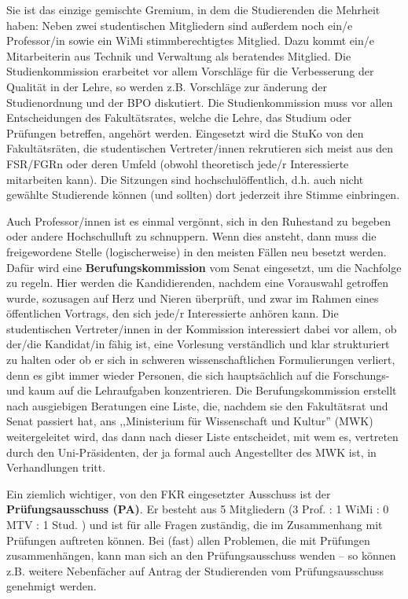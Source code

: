 Sie ist das einzige gemischte Gremium, in dem die Studierenden die Mehrheit 
haben: Neben zwei studentischen Mitgliedern sind außerdem noch ein/e Professor/in sowie ein WiMi stimmberechtigtes Mitglied. 
Dazu kommt ein/e Mitarbeiterin aus Technik und Verwaltung als beratendes Mitglied.
Die Studienkommission erarbeitet vor allem Vorschläge für die Verbesserung der 
Qualität in der Lehre, so werden z.B. Vorschläge zur änderung der 
Studienordnung und der BPO diskutiert. Die Studienkommission muss vor allen 
Entscheidungen des Fakultätsrates, welche die Lehre, das Studium oder 
Prüfungen betreffen, angehört werden. Eingesetzt wird die StuKo von den 
Fakultätsräten, die studentischen Vertreter/innen rekrutieren sich meist aus den 
FSR/FGRn oder deren Umfeld (obwohl theoretisch jede/r Interessierte mitarbeiten 
kann). Die Sitzungen sind hochschulöffentlich, d.h. auch nicht gewählte 
Studierende können (und sollten) dort jederzeit ihre Stimme einbringen.

Auch Professor/innen ist es einmal vergönnt, sich in den Ruhestand zu begeben oder 
andere Hochschulluft zu schnuppern. Wenn dies ansteht, dann muss die 
freigewordene Stelle (logischerweise) in den meisten Fällen neu besetzt 
werden. Dafür wird eine \textbf{Berufungskommission} vom Senat eingesetzt, um 
die Nachfolge zu regeln. Hier werden die Kandidierenden, nachdem eine Vorauswahl 
getroffen wurde, sozusagen auf Herz und Nieren überprüft, und zwar im Rahmen 
eines öffentlichen Vortrags, den sich jede/r Interessierte anhören kann. Die 
 studentischen Vertreter/innen in der Kommission interessiert dabei vor allem, ob 
der/die Kandidat/in fähig ist, eine Vorlesung verständlich und klar 
strukturiert zu halten oder ob er sich in schweren wissenschaftlichen 
Formulierungen verliert, denn es gibt immer wieder Personen, die sich
hauptsächlich auf die Forschungs- und kaum auf die Lehraufgaben konzentrieren.
Die Berufungskommission 
erstellt nach ausgiebigen Beratungen eine Liste, die, nachdem sie den Fakultätsrat und Senat 
passiert hat, ans ,,Ministerium für 
Wissenschaft und Kultur'' (MWK) weitergeleitet wird, das dann nach dieser 
Liste entscheidet, mit wem es, vertreten durch den Uni-Präsidenten, der ja 
formal auch Angestellter des MWK ist, in Verhandlungen tritt.

Ein ziemlich wichtiger, von den FKR eingesetzter Ausschuss ist der 
\textbf{Prüfungsausschuss (PA)}. Er besteht aus 5 Mitgliedern (3 Prof. : 1 WiMi : 0 MTV : 
1 Stud. ) und ist für alle Fragen zuständig, die im Zusammenhang mit Prüfungen
auftreten können. Bei (fast) allen Problemen, die mit Prüfungen 
zusammenhängen, kann
man sich an den Prüfungsausschuss wenden -- so können z.B. weitere
Nebenfächer auf Antrag der Studierenden vom Prüfungsausschuss genehmigt
werden.

